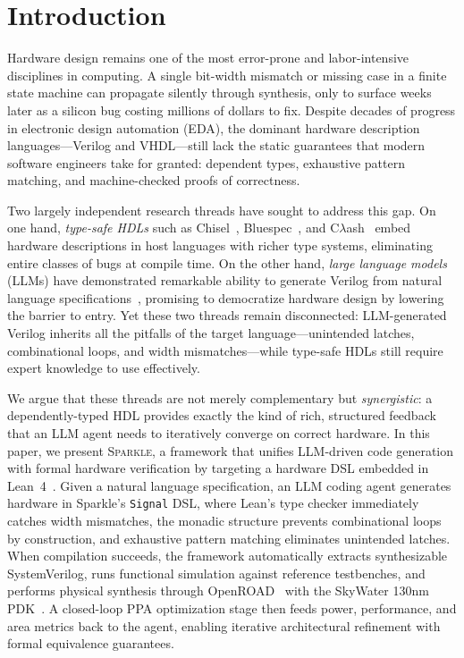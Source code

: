 \section{Introduction}
\label{sec:intro}

Hardware design remains one of the most error-prone and labor-intensive disciplines in computing. A single bit-width mismatch or missing case in a finite state machine can propagate silently through synthesis, only to surface weeks later as a silicon bug costing millions of dollars to fix. Despite decades of progress in electronic design automation (EDA), the dominant hardware description languages---Verilog and VHDL---still lack the static guarantees that modern software engineers take for granted: dependent types, exhaustive pattern matching, and machine-checked proofs of correctness.

Two largely independent research threads have sought to address this gap. On one hand, \emph{type-safe HDLs} such as Chisel~\citep{bachrach2012chisel}, Bluespec~\citep{nikhil2004bluespec}, and C$\lambda$ash~\citep{baaij2010clash} embed hardware descriptions in host languages with richer type systems, eliminating entire classes of bugs at compile time. On the other hand, \emph{large language models} (LLMs) have demonstrated remarkable ability to generate Verilog from natural language specifications~\citep{thakur2023benchmarking,liu2023verilogeval}, promising to democratize hardware design by lowering the barrier to entry. Yet these two threads remain disconnected: LLM-generated Verilog inherits all the pitfalls of the target language---unintended latches, combinational loops, and width mismatches---while type-safe HDLs still require expert knowledge to use effectively.

We argue that these threads are not merely complementary but \emph{synergistic}: a dependently-typed HDL provides exactly the kind of rich, structured feedback that an LLM agent needs to iteratively converge on correct hardware. In this paper, we present \textsc{Sparkle}, a framework that unifies LLM-driven code generation with formal hardware verification by targeting a hardware DSL embedded in Lean~4~\citep{moura2021lean4}. Given a natural language specification, an LLM coding agent generates hardware in Sparkle's \texttt{Signal} DSL, where Lean's type checker immediately catches width mismatches, the monadic structure prevents combinational loops by construction, and exhaustive pattern matching eliminates unintended latches. When compilation succeeds, the framework automatically extracts synthesizable SystemVerilog, runs functional simulation against reference testbenches, and performs physical synthesis through OpenROAD~\citep{ajayi2019openroad} with the SkyWater 130nm PDK~\citep{edwards2004sky130}. A closed-loop PPA optimization stage then feeds power, performance, and area metrics back to the agent, enabling iterative architectural refinement with formal equivalence guarantees.

